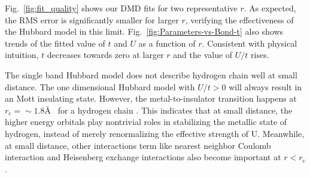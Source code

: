 Fig.~\ref{fig:fit_quality} shows our DMD fits for two representative $r$. As expected, the RMS error 
is significantly smaller for larger $r$, verifying the effectiveness of the Hubbard model 
in this limit. Fig.~\ref{fig:Parameters-vs-Bond-t} also shows trends of the fitted value of $t$ 
and $U$ as a function of $r$. Consistent with physical intuition, $t$ decreases towards zero at larger $r$
and the value of $U/t$ rises. 

The single band Hubbard model does not describe hydrogen chain well at small distance. The one dimensional Hubbard model with $U/t>0$ will always result in an Mott insulating state. However, the metal-to-insulator transition happens at $r_c=\sim1.8$\AA~ for a hydrogen chain \cite{Stella2011}. This indicates that at small distance, the higher energy orbitals play nontrivial roles in stabilizing the metallic state of hydrogen, instead of merely renormalizing the effective strength of U. Meanwhile, at small distance, other interactions term like nearest neighbor Coulomb interaction and Heisenberg exchange interactions also become important at $r<r_c$ \cite{ZhengThesis}. 


